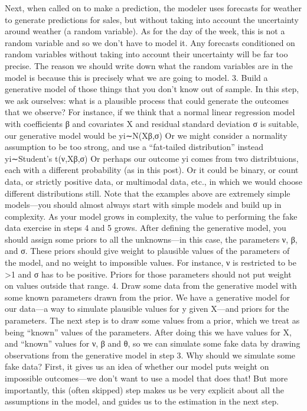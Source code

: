 Next, when called on to make a prediction, the modeler uses forecasts for weather to generate predictions for sales, but without taking into account the uncertainty around weather (a random variable). As for the day of the week, this is not a random variable and so we don’t have to model it. Any forecasts conditioned on random variables without taking into account their uncertainty will be far too precise.
The reason we should write down what the random variables are in the model is because this is precisely what we are going to model.
3. Build a generative model of those things that you don’t know out of sample.
In this step, we ask ourselves: what is a plausible process that could generate the outcomes that we observe? For instance, if we think that a normal linear regression model with coefficients β and covariates X and residual standard deviation σ is suitable, our generative model would be
yi∼N(Xβ,σ)
Or we might consider a normality assumption to be too strong, and use a “fat-tailed distribution” instead
yi∼Student's t(ν,Xβ,σ)
Or perhaps our outcome yi comes from two distribtuions, each with a different probability (as in this post). Or it could be binary, or count data, or strictly positive data, or multimodal data, etc., in which we would choose different distributions still.
Note that the examples above are extremely simple models—you should almost always start with simple models and build up in complexity. As your model grows in complexity, the value to performing the fake data exercise in steps 4 and 5 grows.
After defining the generative model, you should assign some priors to all the unknowns—in this case, the parameters ν, β, and σ. These priors should give weight to plausible values of the parameters of the model, and no weight to impossible values. For instance, ν is restricted to be >1 and σ has to be positive. Priors for those parameters should not put weight on values outside that range.
4. Draw some data from the generative model with some known parameters drawn from the prior.
We have a generative model for our data—a way to simulate plausible values for y given X—and priors for the parameters.
The next step is to draw some values from a prior, which we treat as being “known” values of the parameters. After doing this we have values for X, and “known” values for ν, β and θ, so we can simulate some fake data by drawing observations from the generative model in step 3.
Why should we simulate some fake data? First, it gives us an idea of whether our model puts weight on impossible outcomes—we don’t want to use a model that does that! But more importantly, this (often skipped) step makes us be very explicit about all the assumptions in the model, and guides us to the estimation in the next step.
